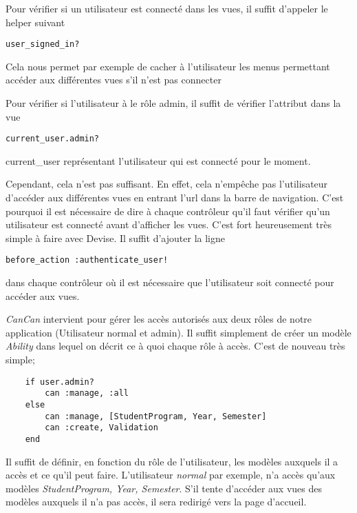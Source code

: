Pour vérifier si un utilisateur est connecté dans les vues, il suffit d'appeler le helper suivant

\begin{lstlisting}
user_signed_in?
\end{lstlisting}

Cela nous permet par exemple de cacher à l'utilisateur les menus permettant accéder aux différentes vues s'il n'est pas connecter

Pour vérifier si l'utilisateur à le rôle admin, il suffit de vérifier l'attribut dans la vue

\begin{lstlisting}
current_user.admin?
\end{lstlisting}

current\_user représentant l'utilisateur qui est connecté pour le moment.


Cependant, cela n'est pas suffisant. En effet, cela n'empêche pas l'utilisateur d'accéder aux différentes vues en entrant l'url dans la barre de navigation. C'est pourquoi il est nécessaire de dire à chaque contrôleur qu'il faut vérifier qu'un utilisateur est connecté avant d'afficher les vues. C'est fort heureusement très simple à faire avec Devise. Il suffit d'ajouter la ligne 
\begin{lstlisting}
before_action :authenticate_user!
\end{lstlisting}

dans chaque contrôleur où il est nécessaire que l'utilisateur soit connecté pour accéder aux vues. 

\textit{CanCan} intervient pour gérer les accès autorisés aux deux rôles de notre application (Utilisateur normal et admin). Il suffit simplement de créer un modèle \textit{Ability} dans lequel on décrit ce à quoi chaque rôle à accès. C'est de nouveau très simple;

\begin{lstlisting}
    if user.admin?
        can :manage, :all
    else
        can :manage, [StudentProgram, Year, Semester]
        can :create, Validation
    end
\end{lstlisting}

Il suffit de définir, en fonction du rôle de l'utilisateur, les modèles auxquels il a accès et ce qu'il peut faire. L'utilisateur \textit{normal} par exemple, n'a accès qu'aux modèles \textit{StudentProgram, Year, Semester}. S'il tente d'accéder aux vues des modèles auxquels il n'a pas accès, il sera redirigé vers la page d’accueil. 

